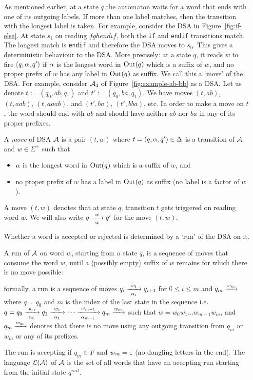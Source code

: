 As mentioned earlier, at a state $q$ the automaton waits for a word
that ends with one of its outgoing labels. If more than one label matches,
then the transition with the longest label is taken.  For example, consider the
DSA in Figure~\ref{fig:if-else}. At
state $s_1$ on reading $fghendif$, both the \texttt{if} and
\texttt{endif} transitions match. The longest match is \texttt{endif}
and therefore the DSA moves to $s_0$. This gives a deterministic
behaviour to the DSA. More precisely: at a state $q$, it reads $w$ to
fire $ (q, \alpha, q') $ if $\alpha$ is the longest word in $\operatorname{Out}(q)$ which is
a suffix of $w$, and no proper prefix of $w$ has any label in
$\operatorname{Out}(q)$ as suffix.  We call this a `move' of the DSA. For example,
consider $\mathcal{A}_4$ of Figure~\ref{fig:example-ab-bb} as a DSA. Let us
denote $t := (q_0, ab, q_1)$ and $t':= (q_0, ba, q_1)$. We have moves
$(t, ab)$, $(t, aab)$, $(t, aaab)$, and $(t', ba)$, $(t', bba)$,
etc. In order to make a move on $t$, the word should end with $ab$ and
should have neither $ab$ nor $ba$ in any of its proper prefixes.


\begin{definition}\label{def:DSA-moves}
  A \emph{move} of DSA $\mathcal{A}$ is a pair $(t, w)$ where
  $t = (q, \alpha, q') \in \Delta$ is a transition of $\mathcal{A}$ and
  $w \in \Sigma^+$ such that
  \begin{itemize}
  \item 
    $\alpha$ is the longest word in $\operatorname{Out}(q)$ which is a suffix of $w$,
    and
  \item 
    no proper prefix of $w$ has a label in $\operatorname{Out}(q)$ as
    suffix (no label is a factor of $w$).
  \end{itemize}
  A move $(t, w)$ denotes that at state $q$, transition $t$ gets
  triggered on reading word $w$. We will also write
  $q \xrightarrow[\alpha]{~w~} q'$ for the move $(t, w)$.
\end{definition}


Whether a word is accepted or rejected is determined by a `run' of the
DSA on it. 

\begin{definition}
  A run of $\mathcal{A}$ on word $w$, starting from a state $q$, is a sequence
  of moves that consume the word $w$, until a (possibly empty) suffix
  of $w$ remains for which there is no move possible: 
  
  formally, a run
  is a sequence of moves $q_i \xrightarrow[\alpha_i]{~w_i~} q_{i+1}$ for $0\le i\le m$ and $q_m \xrightarrow{w_m}$ where $q=q_0$ and $m$ is the index of the last state in the sequence i.e.
  $q = q_0 \xrightarrow[\alpha_0]{~w_0~} q_1 \xrightarrow[\alpha_1]{~w_1~} \cdots
  \xrightarrow[\alpha_{m-1}]{~w_{m-1}~} q_m \xrightarrow{w_m}$ such that
  $w=w_0 w_1 \dots w_{m-1} w_m$, and $q_m \xrightarrow{w_m}$ denotes that
  there is no move using any outgoing transition from $q_m$ on $w_m$
  or any of its prefixes. 
  
  The run is accepting if $q_m \in F$ and
  $w_m = \varepsilon$ (no dangling letters in the end). The language $\mathcal{L}(\mathcal{A})$
  of $\mathcal{A}$ is the set of all words that have an accepting run starting
  from the initial state $q^{init}$.
\end{definition}

